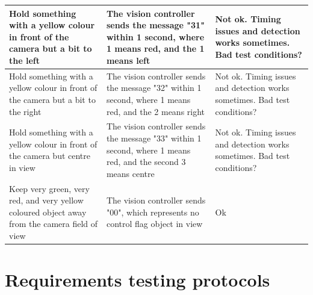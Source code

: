 \documentclass[11pt, titlepage]{article} %
\begin{document}
\begin{table}[H]
\begin{tabular}{|m{5cm}|m{5cm}|m{5cm}|}
Hold something with a yellow colour in front of the camera but a bit to the left  & The vision controller sends the message "31" within 1 second, where 1 means red, and the 1 means left      & Not ok. Timing issues and detection works sometimes. Bad test conditions?  \\ \hline
Hold something with a yellow colour in front of the camera but a bit to the right  & The vision controller sends the message "32" within 1 second, where 1 means red, and the 2 means right      & Not ok. Timing issues and detection works sometimes. Bad test conditions?  \\ \hline
Hold something with a yellow colour in front of the camera but centre in view  & The vision controller sends the message "33" within 1 second, where 1 means red, and the second 3 means centre      & Not ok. Timing issues and detection works sometimes. Bad test conditions?  \\ \hline
Keep very green, very red, and very yellow coloured object away from the camera field of view  &  The vision controller sends "00", which represents no control flag object in view     & Ok  \\ \hline
\end{tabular}
\end{table}

\newpage
\section{Requirements testing protocols}
\label{appendix:requirementsTesting}
\end{document}
